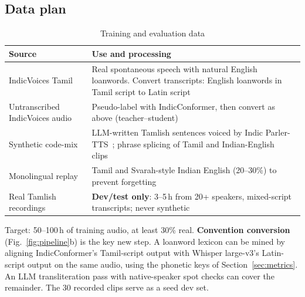 \documentclass[conference]{IEEEtran}
\begin{document}
\subsection{Data plan}
\begin{table}[!t]
\caption{Training and evaluation data}
\label{tab:data}
\footnotesize
\begin{tabularx}{\columnwidth}{@{}p{2.45cm} X@{}}
\toprule
\textbf{Source} & \textbf{Use and processing} \\
\midrule
IndicVoices Tamil~\cite{javed2024indicvoices} & Real spontaneous speech with natural English loanwords. Convert transcripts: English loanwords in Tamil script to Latin script \\
Untranscribed IndicVoices audio & Pseudo-label with IndicConformer, then convert as above (teacher--student) \\
Synthetic code-mix & LLM-written Tamlish sentences voiced by Indic Parler-TTS~\cite{mc_indicparler}; phrase splicing of Tamil and Indian-English clips~\cite{seacs2025} \\
Monolingual replay & Tamil and Svarah-style Indian English (20--30\%) to prevent forgetting~\cite{shah2020cs} \\
Real Tamlish recordings & \textbf{Dev/test only}: 3--5\,h from 20+ speakers, mixed-script transcripts; never synthetic \\
\bottomrule
\end{tabularx}
\end{table}
Target: 50--100\,h of training audio, at least 30\% real. \textbf{Convention conversion} (Fig.~\ref{fig:pipeline}b) is the key new step. A loanword lexicon can be mined by aligning IndicConformer's Tamil-script output with Whisper large-v3's Latin-script output on the same audio, using the phonetic keys of Section~\ref{sec:metrics}. An LLM transliteration pass with native-speaker spot checks can cover the remainder. The 30 recorded clips serve as a seed dev set.
\end{document}
